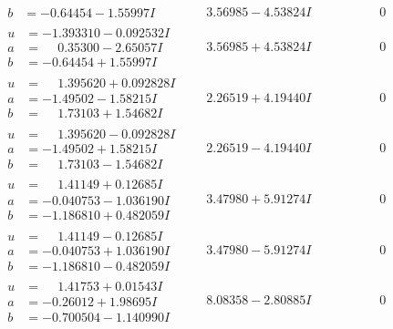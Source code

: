 \documentclass[1p]{elsarticle_modified}
\theoremstyle{definition}
\begin{document}
$$\begin{array}{c|c|c}
\begin{aligned}
b &= -0.64454 - 1.55997 I\end{aligned}
 & \phantom{-}3.56985 - 4.53824 I & \phantom{-0.000000 } 0 \\ \hline\begin{aligned}
u &= -1.393310 - 0.092532 I \\
a &= \phantom{-}0.35300 - 2.65057 I \\
b &= -0.64454 + 1.55997 I\end{aligned}
 & \phantom{-}3.56985 + 4.53824 I & \phantom{-0.000000 } 0 \\ \hline\begin{aligned}
u &= \phantom{-}1.395620 + 0.092828 I \\
a &= -1.49502 - 1.58215 I \\
b &= \phantom{-}1.73103 + 1.54682 I\end{aligned}
 & \phantom{-}2.26519 + 4.19440 I & \phantom{-0.000000 } 0 \\ \hline\begin{aligned}
u &= \phantom{-}1.395620 - 0.092828 I \\
a &= -1.49502 + 1.58215 I \\
b &= \phantom{-}1.73103 - 1.54682 I\end{aligned}
 & \phantom{-}2.26519 - 4.19440 I & \phantom{-0.000000 } 0 \\ \hline\begin{aligned}
u &= \phantom{-}1.41149 + 0.12685 I \\
a &= -0.040753 - 1.036190 I \\
b &= -1.186810 + 0.482059 I\end{aligned}
 & \phantom{-}3.47980 + 5.91274 I & \phantom{-0.000000 } 0 \\ \hline\begin{aligned}
u &= \phantom{-}1.41149 - 0.12685 I \\
a &= -0.040753 + 1.036190 I \\
b &= -1.186810 - 0.482059 I\end{aligned}
 & \phantom{-}3.47980 - 5.91274 I & \phantom{-0.000000 } 0 \\ \hline\begin{aligned}
u &= \phantom{-}1.41753 + 0.01543 I \\
a &= -0.26012 + 1.98695 I \\
b &= -0.700504 - 1.140990 I\end{aligned}
 & \phantom{-}8.08358 - 2.80885 I & \phantom{-0.000000 } 0 \\ \hline\begin{aligned}

\end{aligned}
\end{array}$$
\end{document}

